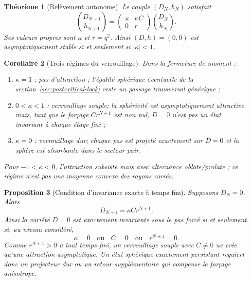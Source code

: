 \documentclass[11pt,a4paper]{article}
\newtheorem{theorem}{Théorème}[section]
\newtheorem{proposition}[theorem]{Proposition}
\newtheorem{corollary}[theorem]{Corollaire}
\begin{document}
\begin{theorem}[Relèvement autonome]\label{thm:v9-autonomous-lift}
Le couple $(D_N,h_N)$ satisfait
\begin{equation}\label{eq:v9-lift-matrix}
 \boxed{
 \binom{D_{N+1}}{h_{N+1}}
 =
 \begin{pmatrix}
 \kappa&\kappa C\\
 0&r
 \end{pmatrix}
 \binom{D_N}{h_N}.}
\end{equation}
Ses valeurs propres sont $\kappa$ et $r=q^2$. Ainsi $(D,h)=(0,0)$ est asymptotiquement stable si et seulement si $|\kappa|<1$.
\end{theorem}

\begin{corollary}[Trois régimes du verrouillage]\label{cor:v9-three-regimes}
Dans la fermeture de moment :
\begin{enumerate}[label=\textup{(\roman*)}]
\item $\kappa=1$ : pas d'attraction ; l'égalité sphérique éventuelle de la section~\ref{sec:postcritical-lock} reste un passage transversal générique ;
\item $0<\kappa<1$ : verrouillage \emph{souple}; la sphéricité est asymptotiquement attractive mais, tant que le forçage $Cr^{N+1}$ est non nul, $D=0$ n'est pas un état invariant à chaque étage fini ;
\item $\kappa=0$ : verrouillage \emph{dur}; chaque pas est projeté exactement sur $D=0$ et la sphère est absorbante dans le secteur pair.
\end{enumerate}
Pour $-1<\kappa<0$, l'attraction subsiste mais avec alternance oblate/prolate ; ce régime n'est pas une moyenne convexe des rayons carrés.
\end{corollary}

\begin{proposition}[Condition d'invariance exacte à temps fini]\label{prop:v9-finite-invariance}
Supposons $D_N=0$. Alors
\[
 D_{N+1}=\kappa Cr^{N+1}.
\]
Ainsi la variété $D=0$ est exactement invariante sous le pas forcé si et seulement si, au niveau considéré,
\begin{equation}\label{eq:v9-invariance-cases}
 \boxed{\kappa=0\quad\text{ou}\quad C=0\quad\text{ou}\quad r^{N+1}=0.}
\end{equation}
Comme $r^{N+1}>0$ à tout temps fini, un verrouillage souple avec $C\ne0$ ne crée qu'une attraction asymptotique. Un état sphérique exactement persistant requiert donc un projecteur dur ou un retour supplémentaire qui compense le forçage anisotrope.
\end{proposition}
\end{document}

